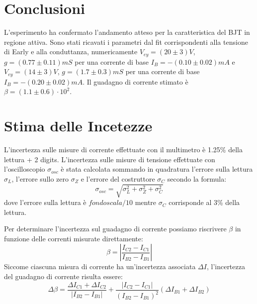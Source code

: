 \documentclass[a4paper,11pt]{article}
\begin{document}
\clearpage
\section{Conclusioni}
L'esperimento ha confermato l'andamento atteso per la caratteristica del BJT in regione attiva. Sono stati ricavati i parametri dal fit corrispondenti alla tensione di Early e alla conduttanza, numericamente $V_{ey} = (20 \pm 3) V$, $g = (0.77 \pm 0.11) mS$ per una corrente di base  $I_B = - (0.10 \pm 0.02) mA$ e $V_{ey} = (14 \pm 3) V$, $g = (1.7 \pm 0.3)mS$ per una corrente di base $I_B = -(0.20 \pm 0.02) mA$. Il guadagno di corrente stimato è $\beta =(1.1 \pm 0.6) \cdot 10^2$.

\appendix
\section{Stima delle Incetezze}
L'incertezza sulle misure di corrente effettuate con il multimetro è 1.25\% della lettura + 2 digits. L'incertezza sulle misure di tensione effettuate con l'oscilloscopio $\sigma_{osc}$ è stata calcolata sommando in quadratura l'errore sulla lettura $\sigma_L$, l'errore sullo zero $\sigma_Z$ e l'errore del costruttore $\sigma_C$ secondo la formula:
\begin{equation*}
  \sigma_{osc} = \sqrt{\sigma_{L}^2+ \sigma_{Z}^2+ \sigma_{C}^2}
\end{equation*}
dove l'errore sulla lettura è $fondo scala / 10$ mentre $\sigma_{C}$ corrisponde al 3\% della lettura.

Per determinare l'incertezza sul guadagno di corrente possiamo riscrivere $\beta$ in funzione delle correnti misurate direttamente:
\begin{equation*}
  \beta = |\frac{I_{C2} - I_{C1}}{I_{B2} - I_{B1}}|
\end{equation*}
Siccome ciascuna misura di corrente ha un'incertezza associata $\Delta I$, l'incertezza del guadagno di corrente risulta essere:
\begin{equation*}
  \Delta\beta = \frac{\Delta I_{C1} + \Delta I_{C2}}{|I_{B2} - I_{B1}|} + \frac{|I_{C2} - I_{C1}|}{(I_{B2}- I_{B1})^2} (\Delta I_{B1} + \Delta I_{B2})
\end{equation*}

\newpage
\end{document}
